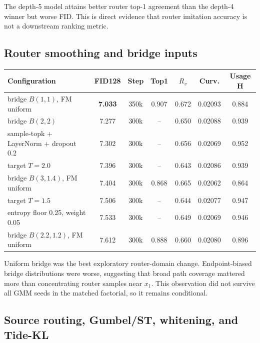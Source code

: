 \documentclass[11pt,a4paper]{article}
\newcommand{\best}[1]{\textbf{#1}}
\newcommand{\na}{--}
\begin{document}
The depth-5 model attains better router top-1 agreement than the depth-4
winner but worse FID. This is direct evidence that router imitation accuracy is
not a downstream ranking metric.

\subsection{Router smoothing and bridge inputs}

\begin{center}
\small
\setlength{\tabcolsep}{3pt}
\begin{tabularx}{\linewidth}{@{}Y c c c c c c@{}}
\toprule
\textbf{Configuration} & \textbf{FID128} & \textbf{Step} &
\textbf{Top1} & \textbf{\(R_v\)} & \textbf{Curv.} &
\textbf{Usage H}\\
\midrule
bridge \(B(1,1)\), FM uniform & \best{7.033} & 350k & 0.907 & 0.672 & 0.02093 & 0.884\\
bridge \(B(2,2)\) & 7.277 & 300k & \na & 0.650 & 0.02088 & 0.939\\
sample-topk + LayerNorm + dropout 0.2 & 7.302 & 300k & \na & 0.656 & 0.02069 & 0.952\\
target \(T=2.0\) & 7.396 & 300k & \na & 0.643 & 0.02086 & 0.939\\
bridge \(B(3,1.4)\), FM uniform & 7.404 & 300k & 0.868 & 0.665 & 0.02062 & 0.864\\
target \(T=1.5\) & 7.506 & 300k & \na & 0.644 & 0.02077 & 0.947\\
entropy floor 0.25, weight 0.05 & 7.533 & 300k & \na & 0.649 & 0.02069 & 0.946\\
bridge \(B(2.2,1.2)\), FM uniform & 7.612 & 300k & 0.888 & 0.660 & 0.02080 & 0.896\\
\bottomrule
\end{tabularx}
\end{center}

Uniform bridge was the best exploratory router-domain change. Endpoint-biased
bridge distributions were worse, suggesting that broad path coverage mattered
more than concentrating router samples near \(x_1\). This observation did not
survive all GMM seeds in the matched factorial, so it remains conditional.

\subsection{Source routing, Gumbel/ST, whitening, and Tide-KL}
\end{document}
